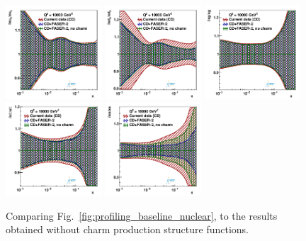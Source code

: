 \begin{figure}[t]
\centering
\includegraphics[width=0.32\textwidth]{plots/nuclear_fasernu2/inclusive-only_vs_inclusive+charm/statOnly_FASERv2_q2_10000_pdf_uv_ratio.pdf}
\includegraphics[width=0.32\textwidth]{plots/nuclear_fasernu2/inclusive-only_vs_inclusive+charm/statOnly_FASERv2_q2_10000_pdf_dv_ratio.pdf}
\includegraphics[width=0.32\textwidth]{plots/nuclear_fasernu2/inclusive-only_vs_inclusive+charm/statOnly_FASERv2_q2_10000_pdf_g_ratio.pdf}\\
\includegraphics[width=0.32\textwidth]{plots/nuclear_fasernu2/inclusive-only_vs_inclusive+charm/statOnly_FASERv2_q2_10000_pdf_Sea_ratio.pdf}
\includegraphics[width=0.32\textwidth]{plots/nuclear_fasernu2/inclusive-only_vs_inclusive+charm/statOnly_FASERv2_q2_10000_pdf_s_ratio.pdf}
\caption{Comparing Fig.~\ref{fig:profiling_baseline_nuclear}, 
to the results obtained without charm production structure functions.
}
\label{fig:profiling_charm_nuclear}
\end{figure}
